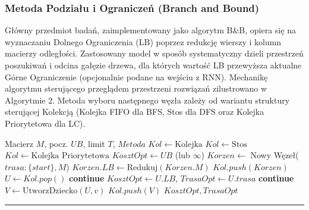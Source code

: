 \documentclass[conference]{IEEEtran}
\begin{document}
            \subsubsection{Metoda Podziału i Ograniczeń (Branch and Bound)}
                Główny przedmiot badań, zaimplementowany jako algorytm B\&B, opiera się na wyznaczaniu Dolnego Ograniczenia (LB) poprzez redukcję wierszy i kolumn macierzy odległości. Zastosowany model w sposób systematyczny dzieli przestrzeń poszukiwań i odcina gałęzie drzewa, dla których wartość LB przewyższa aktualne Górne Ograniczenie (opcjonalnie podane na wejściu z RNN). Mechanikę algorytmu sterującego przeglądem przestrzeni rozwiązań zilustrowano w Algorytmie 2. Metoda wyboru następnego węzła zależy od wariantu struktury sterującej Kolekcją (Kolejka FIFO dla BFS, Stos dla DFS oraz Kolejka Priorytetowa dla LC).
                \begin{algorithm}
                    \caption{Branch and Bound}
                    \begin{algorithmic}[1]
                    \REQUIRE Macierz $M$, pocz. $UB$, limit $T$, $Metoda$
                     \STATE $Kol \leftarrow \text{Kolejka}$
                     \STATE $Kol \leftarrow \text{Stos}$
                     \STATE $Kol \leftarrow \text{Kolejka Priorytetowa}$
                    \ENDIF                   
                    \STATE $KosztOpt \leftarrow UB$ (lub $\infty$)
                    \STATE $Korzen \leftarrow$ Nowy Węzeł($trasa: \{start\}, M$)
                    \STATE $Korzen.LB \leftarrow \text{Redukuj}(Korzen.M)$
                    \STATE $Kol.push(Korzen)$                    
                        \STATE $U \leftarrow Kol.pop()$
                         \STATE \textbf{continue} \ENDIF                        
                            \STATE $KosztOpt \leftarrow U.LB$, $TrasaOpt \leftarrow U.trasa$
                            \STATE \textbf{continue}
                        \ENDIF                        
                            \STATE $V \leftarrow \text{UtworzDziecko}(U, v)$
                             \STATE $Kol.push(V)$ \ENDIF
                        \ENDFOR
                    \ENDWHILE
                    \RETURN $KosztOpt, TrasaOpt$                   
                    \vspace{0.15cm}\hrule\vspace{0.15cm}                   

\end{algorithmic}
\end{algorithm}
\end{document}

